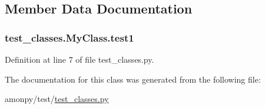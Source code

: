 \subsection{Member Data Documentation}
\hypertarget{classtest__classes_1_1_my_class_ad2d3f2b80c691f06bdec104b23e77cfa}{
\subsubsection[{test1}]{\setlength{\rightskip}{0pt plus 5cm}test\-\_\-classes.\-My\-Class.\-test1}}\label{classtest__classes_1_1_my_class_ad2d3f2b80c691f06bdec104b23e77cfa}


Definition at line 7 of file test\-\_\-classes.\-py.



The documentation for this class was generated from the following file\-:\begin{DoxyCompactItemize}
\item 
amonpy/test/\hyperlink{test__classes_8py}{test\-\_\-classes.\-py}\end{DoxyCompactItemize}
